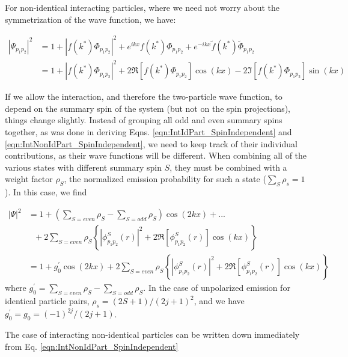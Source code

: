 \documentclass[/home/jesse/Analysis/FemtoAnalysis/AnalysisNotes/AnalysisNoteJBuxton.tex]{subfiles}
\begin{document}
For non-identical interacting particles, where we need not worry about the symmetrization of the wave function, we have:

\begin{equation}
\begin{aligned}
|\Psi_{p_{1}p_{2}}|^{2} &= 1 + |f(k^{*})\Phi_{p_{1}p_{2}}|^{2} + e^{ikx}f(k^{*})\Phi_{p_{1}p_{2}} + e^{-ikx}\tilde{f}(k^{*})\tilde{\Phi}_{p_{1}p_{2}} \\
&= 1 + |f(k^{*})\Phi_{p_{1}p_{2}}|^{2} + 2\Re[f(k^{*})\Phi_{p_{1}p_{2}}]\cos(kx) - 2\Im[f(k^{*})\Phi_{p_{1}p_{2}}]\sin(kx)
\end{aligned}
\label{eqn:IntNonIdPart_SpinIndependent}
\end{equation}



If we allow the interaction, and therefore the two-particle wave function, to depend on the summary spin of the system (but not on the spin projections), things change slightly.
Instead of grouping all odd and even summary spins together, as was done in deriving Eqns. \ref{eqn:IntIdPart_SpinIndependent} and \ref{eqn:IntNonIdPart_SpinIndependent}, we need to keep track of their individual contributions, as their wave functions will be different.
When combining all of the various states with different summary spin $S$, they must be combined with a weight factor $\rho_{S}$, the normalized emission probability for such a state ($\sum_{S}\rho_{s} = 1$).
In this case, we find 

\begin{equation}
\begin{aligned}
|\Psi|^{2} &= 1 + \left(\sum_{S=even}\rho_{S} - \sum_{S=odd}\rho_{S} \right)\cos(2kx) + ... \\
&~~~+ 2\sum_{S=even}\rho_{S}\left\lbrace |\phi^{S}_{p_{1}p_{2}}(r)|^{2} + 2\Re[\phi^{S}_{p_{1}p_{2}}(r)]\cos(kx) \right\rbrace \\
&= 1 + g_{0}^{\prime}\cos(2kx) + 2\sum_{S=even}\rho_{S}\left\lbrace |\phi^{S}_{p_{1}p_{2}}(r)|^{2} + 2\Re[\phi^{S}_{p_{1}p_{2}}(r)]\cos(kx) \right\rbrace
\end{aligned}
\end{equation}
where $g_{0}^{\prime} = \sum_{S=even}\rho_{S} - \sum_{S=odd}\rho_{S}$.
In the case of unpolarized emission for identical particle pairs, $\rho_{s} = (2S+1)/(2j+1)^{2}$, and we have $g_{0}^{\prime} = g_{0} = (-1)^{2j}/(2j+1)$.

The case of interacting non-identical particles can be written down immediately from Eq. \ref{eqn:IntNonIdPart_SpinIndependent}
\end{document}
